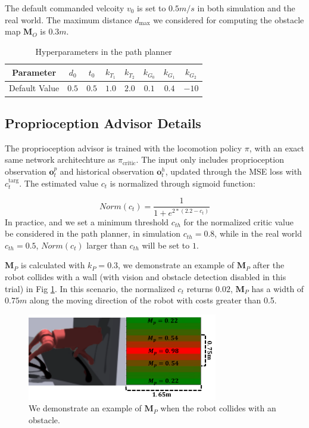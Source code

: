\documentclass[conference]{IEEEtran}
\begin{document}
The default commanded velcoity $v_0$ is set to $0.5m/s$ in both simulation and the real world. The maximum distance $d_\textrm{max}$ we considered for computing the obstacle map $\bm{M}_O$ is $0.3m$.

\begin{table}[h]
\small
\renewcommand{\arraystretch}{1.3}
\caption{Hyperparameters in the path planner}
\begin{center}
\begin{tabular}{|c|c|c|c|c|c|c|c|}
\hline
 Parameter&$d_0$&$t_0$&$k_{T_1}$&$k_{T_2}$&$k_{G_0}$&$k_{G_1}$&$k_{G_2}$\\
 \hline
 Default Value&$0.5$&$0.5$&$1.0$&$2.0$&$0.1$&$0.4$&$-10$\\
 \hline
\end{tabular}
\label{pathplanner}
\end{center}
\end{table}


\subsection{Proprioception Advisor Details}
The proprioception advisor is trained with the locomotion policy ${\pi}$, with an exact same network architechture as $\pi_{\textrm{critic}}$. The input only includes proprioception observation $\bm{o}_t^p$ and historical observation $\bm{o}_t^h$, updated through the MSE loss with $c_t^\textrm{targ}$. The estimated value $c_t$ is normalized through sigmoid function:

\begin{equation}
    Norm(c_t)=\frac{1}{1+e^{2*(2.2-c_t)}}
    \label{norm_ct}
\end{equation}
In practice, and we set a minimum threshold $c_{th}$ for the normalized critic value be considered in the path planner, in simulation $c_{th}=0.8$, while in the real world $c_{th}=0.5$, $Norm(c_t)$ larger than $c_{th}$ will be set to $1$.

$\bm{M}_P$ is calculated with $k_{P}=0.3$, we demonstrate an example of $\bm{M}_P$ after the robot collides with a wall (with vision and obstacle detection disabled in this trial) in Fig \ref{hitwall}. In this scenario, the normalized $c_t$ returns $0.02$, $\bm{M}_P$ has a width of $0.75m$ along the moving direction of the robot with costs greater than 0.5.

\begin{figure}[htbp]
\centerline{\includegraphics[width=8.3cm]{figures/collision.pdf}}
\caption{We demonstrate an example of $\bm{M}_P$ when the robot collides with an obstacle. }
\label{hitwall}
\end{figure}
\end{document}
